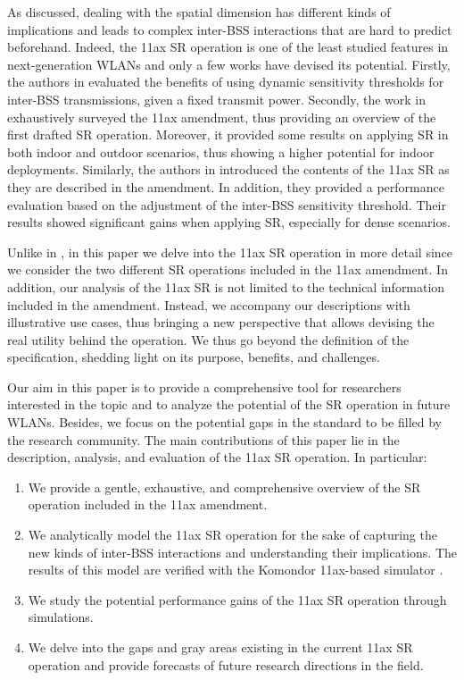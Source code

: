 \documentclass{ieeeaccess}
\begin{document}
As discussed, dealing with the spatial dimension has different kinds of implications and leads to complex inter-BSS interactions that are hard to predict beforehand. Indeed, the 11ax SR operation is one of the least studied features in next-generation WLANs and only a few works have devised its potential. Firstly, the authors in \cite{mori2014performance} evaluated the benefits of using dynamic sensitivity thresholds for inter-BSS transmissions, given a fixed transmit power. Secondly, the work in \cite{qu2018survey} exhaustively surveyed the 11ax amendment, thus providing an overview of the first drafted SR operation. Moreover, it provided some results on applying SR in both indoor and outdoor scenarios, thus showing a higher potential for indoor deployments. Similarly, the authors in \cite{shen2018research} introduced the contents of the 11ax SR as they are described in the amendment. In addition, they provided a performance evaluation based on the adjustment of the inter-BSS sensitivity threshold. Their results showed significant gains when applying SR, especially for dense scenarios. 

Unlike in \cite{mori2014performance, qu2018survey, shen2018research}, in this paper we delve into the 11ax SR operation in more detail since we consider the two different SR operations included in the 11ax amendment. In addition, our analysis of the 11ax SR is not limited to the technical information included in the amendment. Instead, we accompany our descriptions with illustrative use cases, thus bringing a new perspective that allows devising the real utility behind the operation. We thus go beyond the definition of the specification, shedding light on its purpose, benefits, and challenges.

Our aim in this paper is to provide a comprehensive tool for researchers interested in the topic and to analyze the potential of the SR operation in future WLANs. Besides, we focus on the potential gaps in the standard to be filled by the research community. The main contributions of this paper lie in the description, analysis, and evaluation of the 11ax SR operation. In particular:
\begin{enumerate}
	\item We provide a gentle, exhaustive, and comprehensive overview of the SR operation included in the 11ax amendment.
	\item We analytically model the 11ax SR operation for the sake of capturing the new kinds of inter-BSS interactions and understanding their implications. The results of this model are verified with the Komondor 11ax-based simulator \cite{barrachina2019komondor}.
	\item We study the potential performance gains of the 11ax SR operation through simulations. 
	\item We delve into the gaps and gray areas existing in the current 11ax SR operation and provide forecasts of future research directions in the field.
\end{enumerate}
\end{document}
